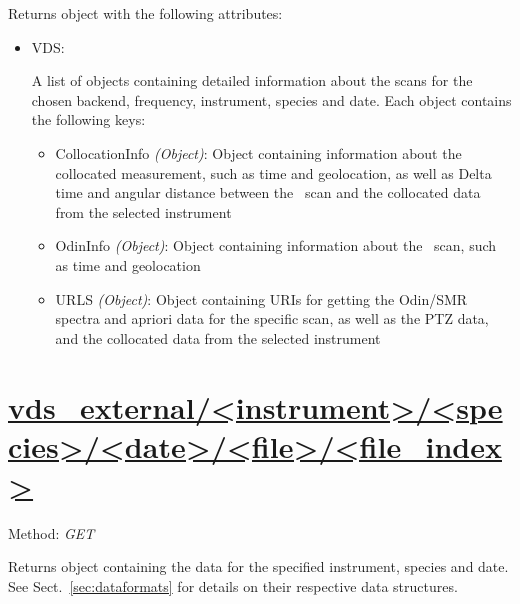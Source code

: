 Returns object with the following attributes:
\begin{itemize}
    \item VDS:

        A list of objects containing detailed information about the scans for
        the chosen backend, frequency, instrument, species and date.
        Each object contains the following keys:

        \begin{itemize}
            \item CollocationInfo \emph{(Object)}: Object containing
                information about the collocated measurement, such as time and
                geolocation, as well as Delta time and angular distance between
                the \smr\ scan and the collocated data from the selected
                instrument
            \item OdinInfo \emph{(Object)}: Object containing information
                about the \smr\ scan, such as time and geolocation
            \item URLS \emph{(Object)}: Object containing URIs for getting the
            Odin/SMR spectra and apriori data for the specific scan, as
            well as the PTZ data, and the collocated data from the selected
            instrument
        \end{itemize}
\end{itemize}


\section{\url{vds_external/<instrument>/<species>/<date>/<file>/<file_index>}}
Method: \emph{GET}

Returns object containing the data for the specified instrument, species and
date. See Sect.~\ref{sec:dataformats} for details on their
respective data structures.

